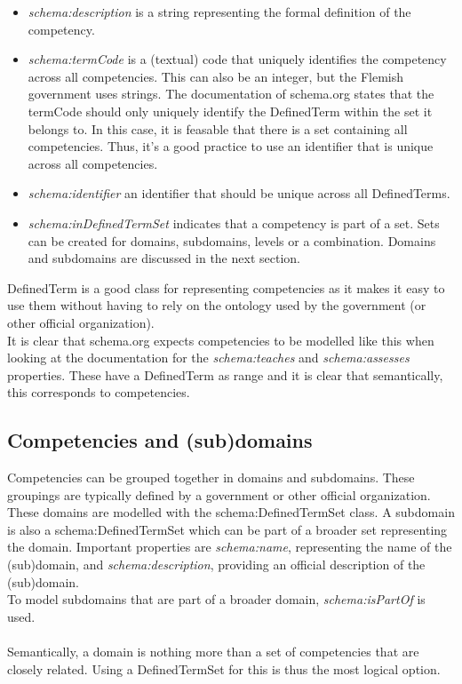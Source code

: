 \documentclass[a4paper]{report}
\begin{document}
    \begin{itemize}
        \item \emph{schema:description} is a string representing the formal definition of the competency.
        \item \emph{schema:termCode} is a (textual) code that uniquely identifies the competency across all competencies. This can also be an integer, but the Flemish government uses strings.
        The documentation of schema.org states that the termCode should only uniquely identify the DefinedTerm within the set it belongs to. In this case, it is feasable that there is a set containing all competencies.
        Thus, it's a good practice to use an identifier that is unique across all competencies.
        \item \emph{schema:identifier} an identifier that should be unique across all DefinedTerms.
        \item \emph{schema:inDefinedTermSet} indicates that a competency is part of a set. Sets can be created for domains, subdomains, levels or a combination. Domains and subdomains are discussed in the next section.
    \end{itemize}
    DefinedTerm is a good class for representing competencies as it makes it easy to use them without having to rely on the ontology used by the government (or other official organization).\\
    It is clear that schema.org expects competencies to be modelled like this when looking at the documentation \cite{schema} for the \textit{schema:teaches} and \textit{schema:assesses} properties. These have a DefinedTerm as range and it is clear that semantically, this corresponds to competencies.

    \subsection{Competencies and (sub)domains}

    Competencies can be grouped together in domains and subdomains. These groupings are typically defined by a government or other official organization.\\
    These domains are modelled with the schema:DefinedTermSet class. A subdomain is also a schema:DefinedTermSet which can be part of a broader set representing the domain.
    Important properties are \textit{schema:name}, representing the name of the (sub)domain, and \textit{schema:description}, providing an official description of the (sub)domain.\\
    To model subdomains that are part of a broader domain, \textit{schema:isPartOf} is used.\\ \\
    Semantically, a domain is nothing more than a set of competencies that are closely related. Using a DefinedTermSet for this is thus the most logical option.
\end{document}
